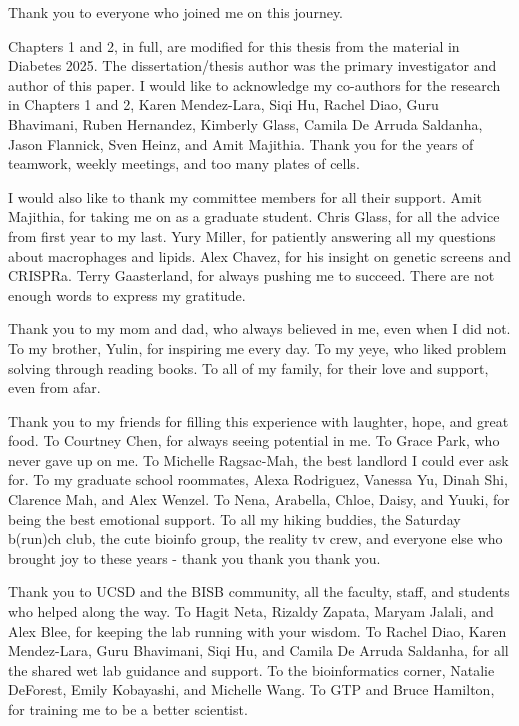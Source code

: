 \documentclass[11pt]{formatting-template}
\begin{document}
\begin{acknowledgements}

\noindent Thank you to everyone who joined me on this journey. 

Chapters 1 and 2, in full, are modified for this thesis from the material in Diabetes 2025. The dissertation/thesis author was the primary investigator and author of this paper. I would like to acknowledge my co-authors for the research in Chapters 1 and 2, Karen Mendez-Lara, Siqi Hu, Rachel Diao, Guru Bhavimani, Ruben Hernandez, Kimberly Glass, Camila De Arruda Saldanha, Jason Flannick, Sven Heinz, and Amit Majithia. Thank you for the years of teamwork, weekly meetings, and too many plates of cells.

I would also like to thank my committee members for all their support. Amit Majithia, for taking me on as a graduate student. Chris Glass, for all the advice from first year to my last. Yury Miller, for patiently answering all my questions about macrophages and lipids. Alex Chavez, for his insight on genetic screens and CRISPRa. Terry Gaasterland, for always pushing me to succeed. There are not enough words to express my gratitude. 

Thank you to my mom and dad, who always believed in me, even when I did not. To my brother, Yulin, for inspiring me every day. To my yeye, who liked problem solving through reading books. To all of my family, for their love and support, even from afar. 

Thank you to my friends for filling this experience with laughter, hope, and great food. To Courtney Chen, for always seeing potential in me. To Grace Park, who never gave up on me. To Michelle Ragsac-Mah, the best landlord I could ever ask for. To my graduate school roommates, Alexa Rodriguez, Vanessa Yu, Dinah Shi, Clarence Mah, and Alex Wenzel. To Nena, Arabella, Chloe, Daisy, and Yuuki, for being the best emotional support. To all my hiking buddies, the Saturday b(run)ch club, the cute bioinfo group, the reality tv crew, and everyone else who brought joy to these years - thank you thank you thank you.

Thank you to UCSD and the BISB community, all the faculty, staff, and students who helped along the way. To Hagit Neta, Rizaldy Zapata, Maryam Jalali, and Alex Blee, for keeping the lab running with your wisdom. To Rachel Diao, Karen Mendez-Lara, Guru Bhavimani, Siqi Hu, and Camila De Arruda Saldanha, for all the shared wet lab guidance and support. To the bioinformatics corner, Natalie DeForest, Emily Kobayashi, and Michelle Wang. To GTP and Bruce Hamilton, for training me to be a better scientist. 


\end{acknowledgements}
\end{document}

